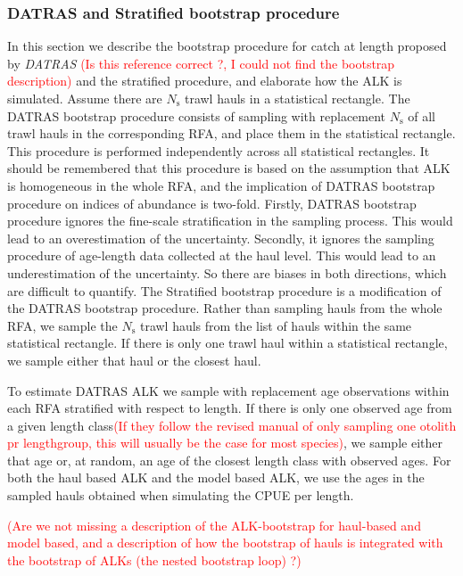 \documentclass[a4paper 12pt]{article}
\numberwithin{equation}{section}
\newcommand{\ed}[1]{\textcolor{red}{#1}}
\begin{document}
{\subsubsection{DATRAS and Stratified bootstrap procedure}
\label{sec:datrasstratifiedbootstrap}
In this section we describe the bootstrap procedure for catch at length proposed by \emph{DATRAS} \citep{ICES2013} \ed{(Is this reference correct ?, I could not find the bootstrap description)} and the stratified procedure, and elaborate how the ALK is simulated. Assume there are $N_{\text{s}}$ trawl hauls in a statistical rectangle. The DATRAS bootstrap procedure consists of sampling with replacement $N_{\text{s}}$ of all trawl hauls in the corresponding RFA, and place them in the statistical rectangle. This procedure is performed independently across all statistical rectangles. It should be remembered that this procedure is based on the assumption that ALK is homogeneous in the whole RFA, and the implication of DATRAS bootstrap procedure on indices of abundance is two-fold. Firstly, DATRAS bootstrap procedure ignores the fine-scale stratification in the sampling process. This would lead to an overestimation of the uncertainty. Secondly, it ignores the sampling procedure of age-length data collected at the haul level. This would lead  to an underestimation of the uncertainty. So there are biases in both directions, which are difficult to quantify. The Stratified bootstrap procedure is a modification of the DATRAS bootstrap procedure. Rather than sampling hauls from the whole RFA, we  sample the $N_{\text{s}}$ trawl hauls from the list of hauls within the same statistical rectangle. If there is only one trawl haul within a statistical rectangle, we sample either that haul or the closest haul.

To estimate DATRAS ALK we sample with replacement age observations within each RFA stratified with respect to length. If there is only one observed age from a given length class\ed{(If they follow the revised manual of only sampling one otolith pr lengthgroup, this will usually be the case for most species)}, we sample either that age or, at random, an age of the closest length class with observed ages. For both the haul based ALK and the model based ALK, we use the ages in the sampled hauls obtained when simulating the CPUE per length.

\ed{(Are we not missing a description of the ALK-bootstrap for haul-based and model based, and a description of how the bootstrap of hauls is integrated with the bootstrap of ALKs (the nested bootstrap loop) ?)}

}
\end{document}
